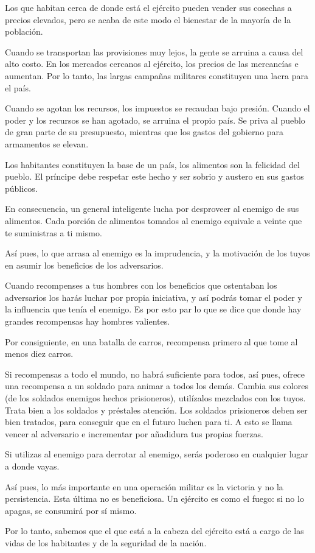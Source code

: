 Los que habitan cerca de donde está el ejército pueden vender sus cosechas a precios elevados, pero se acaba de este modo el bienestar de la mayoría de la población.

Cuando se transportan las provisiones muy lejos, la gente se arruina a causa del alto costo. En los mercados cercanos al ejército, los precios de las mercancías e aumentan. Por lo tanto, las largas campañas militares constituyen una lacra para el país.

Cuando se agotan los recursos, los impuestos se recaudan bajo presión. Cuando el poder y los recursos se han agotado, se arruina el propio país. Se priva al pueblo de gran parte de su presupuesto, mientras que los gastos del gobierno para armamentos se elevan.

Los habitantes constituyen la base de un país, los alimentos son la felicidad del pueblo. El príncipe debe respetar este hecho y ser sobrio y austero en sus gastos públicos.

En consecuencia, un general inteligente lucha por desproveer al enemigo de sus alimentos. Cada porción de alimentos tomados al enemigo equivale a veinte que te suministras a ti mismo.

Así pues, lo que arrasa al enemigo es la imprudencia, y la motivación de los tuyos en asumir los beneficios de los adversarios.

Cuando recompenses a tus hombres con los beneficios que ostentaban los adversarios los harás luchar por propia iniciativa, y así podrás tomar el poder y la influencia que tenía el enemigo. Es por esto par lo que se dice que donde hay grandes recompensas hay hombres valientes.

Por consiguiente, en una batalla de carros, recompensa primero al que tome al menos diez carros.

Si recompensas a todo el mundo, no habrá suficiente para todos, así pues, ofrece una recompensa a un soldado para animar a todos los demás. Cambia sus colores (de los soldados enemigos hechos prisioneros), utilízalos mezclados con los tuyos. Trata bien a los soldados y préstales atención. Los soldados prisioneros deben ser bien tratados, para conseguir que en el futuro luchen para ti. A esto se llama vencer al adversario e incrementar por añadidura tus propias fuerzas.

Si utilizas al enemigo para derrotar al enemigo, serás poderoso en cualquier lugar a donde vayas.

Así pues, lo más importante en una operación militar es la victoria y no la persistencia. Esta última no es beneficiosa. Un ejército es como el fuego: si no lo apagas, se consumirá por sí mismo.

Por lo tanto, sabemos que el que está a la cabeza del ejército está a cargo de las vidas de los habitantes y de la seguridad de la nación.
 
